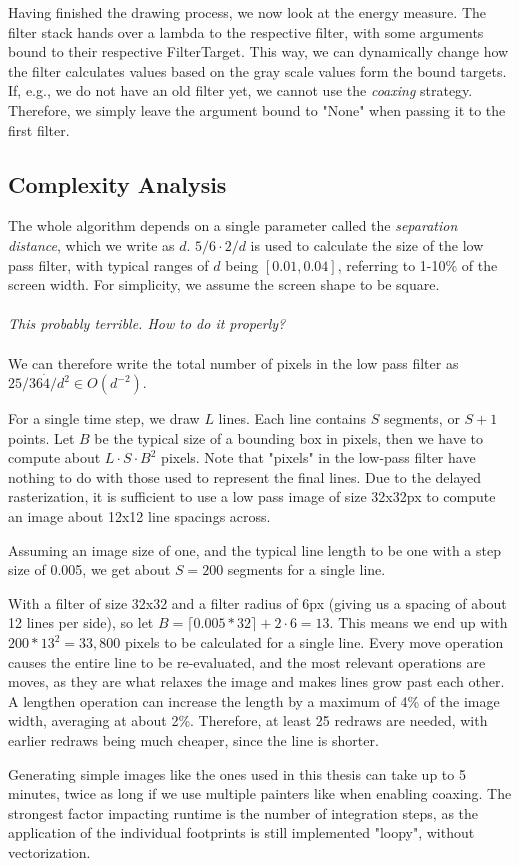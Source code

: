 Having finished the drawing process, we now look at the energy measure.
The filter stack hands over a lambda to the respective filter, with some arguments bound to their respective FilterTarget.
This way, we can dynamically change how the filter calculates values based on the gray scale values form the bound targets.
If, e.g., we do not have an old filter yet, we cannot use the \textit{coaxing} strategy.
Therefore, we simply leave the argument bound to "None" when passing it to the first filter.


\subsection{Complexity Analysis}
The whole algorithm depends on a single parameter called the \textit{separation distance}, which we write as $d$.
$5/6 \cdot 2 / d$ is used to calculate the size of the low pass filter, with typical ranges of $d$ being $[0.01, 0.04]$,
referring to 1-10\% of the screen width. For simplicity, we assume the screen shape to be square.
\\\\\textit{This probably terrible. How to do it properly?}\\\\
We can therefore write the total number of pixels in the low pass filter as $25/36 \dot 4 / d^2 \in O(d^{-2})$.

For a single time step, we draw $L$ lines. Each line contains $S$ segments, or $S+1$ points.
Let $B$ be the typical size of a bounding box in pixels, then we have to compute about $L \cdot S \cdot B^2$ pixels.
Note that "pixels" in the low-pass filter have nothing to do with those used to represent the final lines.
Due to the delayed rasterization, it is sufficient to use a low pass image of size 32x32px to compute an image about 12x12 line spacings across.

Assuming an image size of one, and the typical line length to be one with a step size of 0.005, we get about
$S=200$ segments for a single line.

With a filter of size 32x32 and a filter radius of 6px (giving us a spacing of about 12 lines per side), so let
$B=\lceil0.005 * 32\rceil + 2 \cdot 6 = 13$.
This means we end up with $200 * 13^2 = 33,800$ pixels to be calculated for a single line.
Every move operation causes the entire line to be re-evaluated, and the most relevant operations are moves, as they are what relaxes the image and makes lines grow past each other.
A lengthen operation can increase the length by a maximum of 4\% of the image width, averaging at about 2\%.
Therefore, at least 25 redraws are needed, with earlier redraws being much cheaper, since the line is shorter.

Generating simple images like the ones used in this thesis can take up to 5 minutes, twice as long if we use multiple painters like when enabling coaxing.
The strongest factor impacting runtime is the number of integration steps, as the application of the individual footprints is still implemented "loopy", without vectorization.

